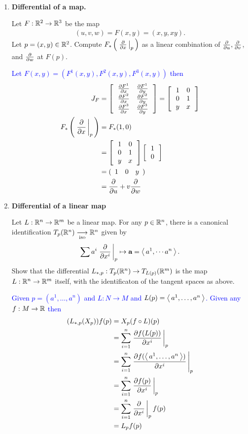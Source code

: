 \documentclass[12pt,a4paper]{report}
\newcommand{\BLUE}[1]{\textcolor{blue}{#1}}
\begin{document}
\begin{enumerate}[label=8.\arabic*.]

\item \textbf{Differential of a map.}

Let $F: \mathbb{R}^2 \to \mathbb{R}^3$ be the map
\begin{align*}
	(u,v,w) = F(x,y) = (x,y,xy).
\end{align*}Let $p =(x,y)\in \mathbb{R}^2$.  Compute $F_*\left (\, \left . \frac{\partial }{\partial x} \, \right |_p \,\right )$ as a linear combination of $\frac{\partial }{\partial u}, \frac{\partial }{\partial v}$, and $\frac{\partial }{\partial w}$ at $F(p)$.

\BLUE{Let $F(x,y) = (F^1(x,y), F^2(x,y), F^3(x,y))$ then
\begin{align*}
	J_F &= \left [\, \begin{array}{cc}
		\frac{\partial F^1}{\partial x} & \frac{\partial F^1}{\partial y} \\
		\frac{\partial F^2}{\partial x} & \frac{\partial F^2}{\partial y} \\
		\frac{\partial F^3}{\partial x} & \frac{\partial F^3}{\partial y}
	\end{array}
	 \,\right ] = \left [\, \begin{array}{cc}
		1 & 0 \\
		0 & 1 \\
		y & x
	\end{array}
	 \,\right ]\\
	F_*\left (\, \left . \frac{\partial }{\partial x} \, \right |_p \,\right ) &= F_*(1,0) \\
	&= \left [\, \begin{array}{cc}
		1 & 0 \\
		0 & 1 \\
		y & x
	\end{array}
	 \,\right ] \left [\, \begin{array}{c} 1 \\ 0 \end{array}  \,\right ]\\
	&= (\begin{array}{cccccccccc}  1 & 0 & y \end{array}) \\
	&= \frac{\partial }{\partial u} + v\frac{\partial }{\partial w}
\end{align*}
}

\item \textbf{Differential of a linear map}

Let $L: \mathbb{R}^n\to \mathbb{R}^m$ be a linear map.  For any $p \in \mathbb{R}^n$, there is a canonical identification $T_p(\mathbb{R}^n)\underset{\text{iso}}\longrightarrow \mathbb{R}^n$ given by 
\begin{align*}
	\sum a^i \left . \frac{\partial }{\partial x^i} \, \right |_p \mapsto \textbf{a}=\left \langle\, a^1,\cdots a^n \,\right \rangle.
\end{align*}Show that the differential $L_{*,p}:T_p(\mathbb{R}^n)\to T_{L(p)}(\mathbb{R}^m)$ is the map $L: \mathbb{R}^n\to\mathbb{R}^m$ itself, with the identificaton of the tangent spaces as above.

\BLUE{Given $p=(a^1, \dots, a^n)$ and $L: N \to M$ and $L(p) = \left \langle\, a^1, \dots, a^n \,\right \rangle$. Given any $f: M \to \mathbb{R}$ then
\begin{align*}
	(L_{*,p}(X_p))f(p) &= X_p(f \circ L)(p) \\
	&= \sum_{i=1}^n \left . \frac{\partial f(L(p))}{\partial x^i} \, \right |_p \\
	&= \sum_{i=1}^n \left . \frac{\partial f(\left \langle\, a^1,\dots,a^n \,\right \rangle)}{\partial x^i} \, \right |_p \\
	&= \sum_{i=1}^n \left . \frac{\partial f(p)}{\partial x^i} \, \right |_p \\
	&= \sum_{i=1}^n \left . \frac{\partial }{\partial x^i} \, \right |_p f(p)\\
	&= L_p f(p)
\end{align*}
}


\end{enumerate}
\end{document}
